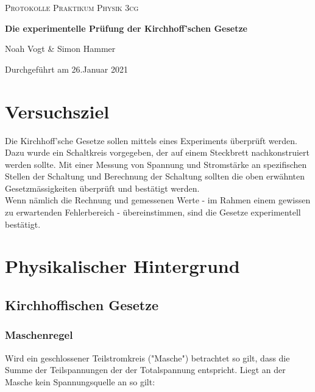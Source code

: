 \documentclass[a4paper,12pt]{article}
\begin{document}
\begin{titlepage}

\vspace*{1cm}
	\centering
	
	{\scshape\Large Protokolle Praktikum Physik 3cg \par}
	\vspace{0.5cm}
	{\huge\bfseries Die experimentelle Prüfung der Kirchhoff'schen Gesetze\par}
	\vspace{0.5cm}
	{\Large Noah Vogt \& Simon Hammer\par}
	\vspace{17cm}

	{\large Durchgeführt am 26.Januar 2021\par}
	
\end{titlepage}

\tableofcontents
\pagebreak

\section{Versuchsziel}
Die Kirchhoff'sche Gesetze sollen mittels eines Experiments überprüft werden. Dazu wurde ein Schaltkreis vorgegeben, der auf einem Steckbrett nachkonstruiert werden sollte. Mit einer Messung von Spannung und Stromstärke an spezifischen Stellen der Schaltung und Berechnung der Schaltung sollten die oben erwähnten Gesetzmässigkeiten überprüft und bestätigt werden.\\

Wenn nämlich die Rechnung und gemessenen Werte - im Rahmen einem gewissen zu erwartenden Fehlerbereich - übereinstimmen, sind die Gesetze experimentell bestätigt.
\section{Physikalischer Hintergrund}

\subsection{Kirchhoffischen Gesetze}
\subsubsection{Maschenregel}

Wird ein geschlossener Teilstromkreis ("Masche") betrachtet so gilt, dass die Summe der 
Teilspannungen der der Totalspannung entspricht. Liegt an der Masche kein Spannungsquelle an so
gilt:
\end{document}
